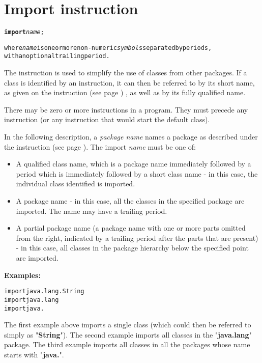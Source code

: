 \chapter{Import instruction}\label{refimport}
\begin{shaded}
\begin{alltt}
\textbf{import} \emph{name};

where \emph{name} is one or more non-numeric \emph{symbol}s separated by periods,\\ with an optional trailing period.
\end{alltt}
\end{shaded}
 
The  instruction is used to simplify the use of
classes from other packages.
If a class is identified by an  instruction, it can then
be referred to by its short name, as given on the
  instruction (see page \pageref{refclass}) , as well as by its fully
qualified name.
 
There may be zero or more  instructions in a program.
They must precede any  instruction (or any instruction
that would start the default class).
 
In the following description, a \emph{package name} names a package
as described under the   instruction (see page \pageref{refpackage}).
The import \emph{name} must be one of:
\begin{itemize}
\item A qualified class name, which is a package name immediately followed
by a period which is immediately followed by a short class name - in this case, the individual class identified is imported.
\item A package name - in this case, all the classes in the specified
package are imported.  The name may have a trailing period.
\item A partial package name (a package name with one or more parts
omitted from the right, indicated by a trailing period after the parts
that are present) - in this case, all classes in the package hierarchy
below the specified point are imported.
\end{itemize}
 \textbf{Examples:}
\begin{alltt}
import java.lang.String
import java.lang
import java.
\end{alltt}
The first example above imports a single class (which could then be
referred to simply as "\textbf{String}").
The second example imports all classes in the
"\textbf{java.lang}" package.
The third example imports all classes in all the packages whose name
starts with "\textbf{java.}".
 
